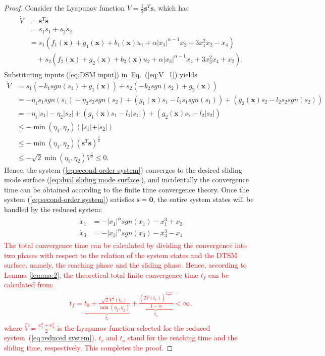 \documentclass[3p]{elsarticle}
\theoremstyle{plain}
\theoremstyle{remark}
\begin{document}
\begin{proof}
Consider the Lyapunov function $V=\frac{1}{2}{\bm s}^T\bm s$, which has
\begin{align}
\begin{split}
\dot V &= {\bm s}^T\dot{\bm  s}\\
&=s_1\dot s_1+s_2\dot s_2\\
&=s_1(f_1(\bm x)+g_1(\bm x)+b_1(\bm x)u_1+\alpha\vert x_1\vert^{\alpha-1}x_2+3x_1^2x_2-x_4)\\
&\quad +s_2(f_2(\bm x)+g_2(\bm x)+b_2(\bm x)u_2+\alpha\vert x_3\vert^{\alpha-1}x_4+3x_3^2x_4+x_2).\label{eq:V_1}
\end{split}
\end{align}
Substituting inputs (\ref{eq:DSM input}) in~Eq.~(\ref{eq:V_1}) yields
\begin{align*}
\dot V &= s_1(-k_1sgn(s_1)+g_1(\bm x))+s_2(-k_2sgn(s_2)+g_2(\bm x))\\
&= -\eta_1s_1sgn(s_1)-\eta_2s_2sgn(s_2)+(g_1(\bm x)s_1 - l_1s_1sgn(s_1))+(g_2(\bm x)s_2 - l_2s_2sgn(s_2))\\
&= -\eta_1\vert s_1\vert-\eta_2\vert s_2\vert+(g_1(\bm x)s_1 - l_1\vert s_1\vert)+(g_2(\bm x)s_2 - l_2\vert s_2\vert)\\
&\le - \min(\eta_1,\eta_2)(\vert s_1\vert+\vert s_2\vert)\\
&\le -\min(\eta_1,\eta_2)({\bm s}^T\bm s)^\frac{1}{2}\\
&\le -\sqrt{2}\min(\eta_1,\eta_2)V^\frac{1}{2}\le 0.
\end{align*}
Hence, the system (\ref{eq:second-order system}) converges to the desired sliding mode  surface (\ref{eq:dual sliding mode  surface}), and incidentally the convergence time can be obtained according to the finite time convergence theory. Once the system (\ref{eq:second-order system}) satisfies $\bm s = \bm 0$, the entire system states will be handled by the reduced system:
\begin{align}
  \begin{split}
\dot x_1&=-\vert x_1\vert^\alpha sgn(x_1)-x_1^3+x_3\\
\dot x_3&=-\vert x_3\vert^\alpha sgn(x_3)-x_3^3-x_1\label{eq:reduced system}
\end{split}
\end{align}
\textcolor{red}{The total convergence time can be calculated by dividing the convergence into two phases with respect to the relation of the system states and the DTSM surface, namely, the reaching phase and the sliding phase. Hence, according to Lemma \ref{lemma:2}, the theoretical total finite convergence time $t_f$ can be calculated from:
\begin{align}
t_f = \underbrace{t_0+\frac{\sqrt{2}V^{\frac{1}{2}}(t_0)}{\min(\eta_1,\eta_2)}}_{t_r}+\underbrace{\frac{(2\hat V(t_r))^{\frac{1-\alpha}{2}}}{1-\alpha}}_{t_s}<\infty,
\end{align}
where $\hat V = \frac{x_1^2+x_3^2}{2}$ is the Lyapunov function selected for the reduced system~(\ref{eq:reduced system}). $t_r$ and $t_s$ stand for the reaching time and the sliding time, respectively. This completes the proof.}
\end{proof}
\end{document}
